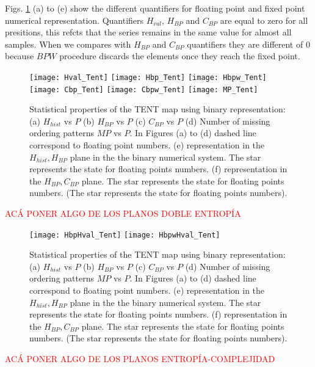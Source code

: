 Figs. \ref{fig:TENT_QuantiB} (a) to (e) show the different quantifiers for floating point and fixed point numerical representation.
Quantifiers $H_{val}$, $H_{BP}$ and $C_{BP}$ are equal to zero for all presitions, this refcts that the series remains in the same value for almost all samples. 
When we compares with $H_{BP}$ and $C_{BP}$ quantifiers they are different of $0$ because  $BPW$ procedure discards the elements once they reach the fixed point.

\begin{figure}
	\texttt{[image: Hval\_Tent]}
	\texttt{[image: Hbp\_Tent]}
	\texttt{[image: Hbpw\_Tent]}
	\texttt{[image: Cbp\_Tent]}
	\texttt{[image: Cbpw\_Tent]}
	\texttt{[image: MP\_Tent]}
	\caption{Statistical properties of the TENT map using binary representation: (a) $H_{hist}$ vs $P$ (b) $H_{BP}$ vs $P$ (c) $C_{BP}$ vs $P$ (d) Number of missing ordering patterns $MP$ vs $P$. In Figures (a) to (d) dashed line correspond to floating point numbers. (e) representation in the $H_{hist},H_{BP}$ plane in the the binary numerical system.  The star represents the state for floating points numbers. (f) representation in the $H_{BP},C_{BP}$ plane.  The star represents the state for floating points numbers. (The star represents the state for floating points numbers). } \label{fig:TENT_QuantiB}
\end{figure}

\textcolor{red}{ACÁ PONER ALGO DE LOS PLANOS DOBLE ENTROPÍA}

\begin{figure}
	\texttt{[image: HbpHval\_Tent]}
	\texttt{[image: HbpwHval\_Tent]}
	\caption{Statistical properties of the TENT map using binary representation: (a) $H_{hist}$ vs $P$ (b) $H_{BP}$ vs $P$ (c) $C_{BP}$ vs $P$ (d) Number of missing ordering patterns $MP$ vs $P$. In Figures (a) to (d) dashed line correspond to floating point numbers. (e) representation in the $H_{hist},H_{BP}$ plane in the the binary numerical system.  The star represents the state for floating points numbers. (f) representation in the $H_{BP},C_{BP}$ plane.  The star represents the state for floating points numbers. (The star represents the state for floating points numbers). } \label{fig:TENT_HH}
\end{figure}

\textcolor{red}{ACÁ PONER ALGO DE LOS PLANOS ENTROPÍA-COMPLEJIDAD}

